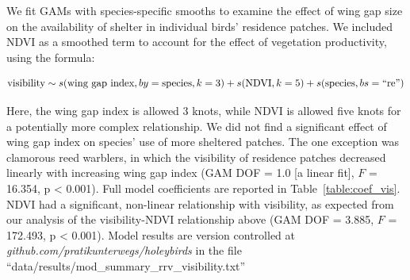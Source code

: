 We fit GAMs with species-specific smooths to examine the effect of wing gap size on the availability of shelter in individual birds' residence patches.
We included NDVI as a smoothed term to account for the effect of vegetation productivity, using the formula:
\begin{linenomath*}
$$ \text{visibility} \sim s(\text{wing gap index}, by = \text{species}, k = 3) + \\
    s(\text{NDVI}, k = 5) + s(\text{species}, bs = \text{``re''})
$$
\end{linenomath*}
Here, the wing gap index is allowed 3 knots, while NDVI is allowed five knots for a potentially more complex relationship.
We did not find a significant effect of wing gap index on species' use of more sheltered patches.
The one exception was clamorous reed warblers, in which the visibility of residence patches decreased linearly with increasing wing gap index (GAM DOF = 1.0 [a linear fit], $F$ = 16.354, p < 0.001).
Full model coefficients are reported in Table~\ref{table:coef_vis}.
NDVI had a significant, non-linear relationship with visibility, as expected from our analysis of the visibility-NDVI relationship above (GAM DOF = 3.885, $F$ = 172.493, p < 0.001).
Model results are version controlled at \textit{github.com/pratikunterwegs/holeybirds} in the file ``data/results/mod\_summary\_rrv\_visibility.txt''

